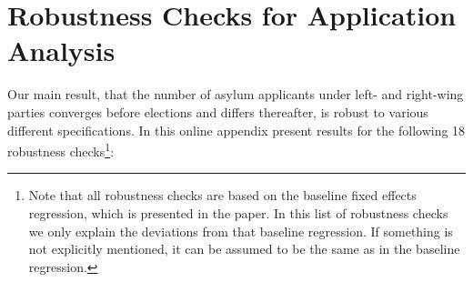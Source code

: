 \documentclass[11pt,a4paper]{scrartcl}
\begin{document}
% 
% 

 

 

\clearpage
\FloatBarrier
\section{Robustness Checks for Application Analysis}
Our main result, that the number of asylum applicants under left- and right-wing parties converges before elections and differs thereafter,  is robust to various different specifications. In this online appendix present results for the following 18 robustness checks\footnote{Note that all robustness checks are based on the baseline fixed effects regression, which is presented in the paper. In this list of robustness checks we only explain the deviations from that baseline regression. If something is not explicitly mentioned, it can be assumed to be the same as in the baseline regression.}:
\end{document}
